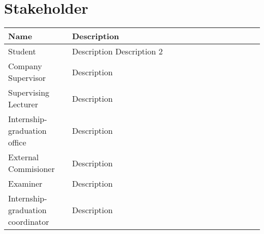 \documentclass{report}
\begin{document}
\chapter*{Stakeholder}
\begin{table}[htbp]
	\begin{center}
		\begin{tabular}{|p{0.25\linewidth}|p{0.75\linewidth}|} \hline
			\textbf{Name} & \textbf{Description} \\ \hline
            Student & Description \newline
            Description 2 \\ \hline
            Company Supervisor & Description \\ \hline
            Supervising Lecturer & Description \\ \hline
            Internship-graduation office & Description \\ \hline
            External Commisioner & Description \\ \hline
            Examiner & Description \\ \hline
            Internship-graduation coordinator & Description \\ \hline
            
		\end{tabular}	
    \end{center}
\end{table}
\end{document}
